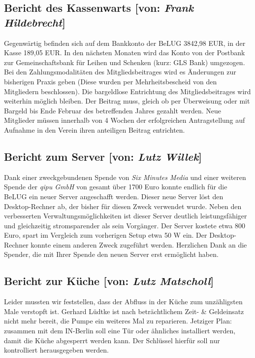 \documentclass[11pt,a4paper,ngerman]{article}
\begin{document}
  \subsection{Bericht des Kassenwarts [von: 
\textcolor{hellgrau.60}{\textsl{Frank Hildebrecht}}]}

Gegenwärtig befinden sich auf dem Bankkonto der BeLUG 3842,98 EUR, in der Kasse 
189,05 EUR. In den nächsten Monaten wird das Konto von der Postbank zur 
Gemeinschaftsbank für Leihen und Schenken (kurz: GLS Bank) umgezogen. Bei den 
Zahlungsmodalitäten des Mitgliedsbeitrages wird es Änderungen zur 
bisherigen Praxis geben (Diese wurden per Mehrheitsbescheid von den Mitgliedern 
beschlossen). Die bargeldlose Entrichtung des Mitgliedsbeitrages wird weiterhin 
möglich bleiben. Der Beitrag muss, gleich ob per Überweisung oder mit Bargeld 
bis Ende Februar des betreffenden Jahres gezahlt werden. Neue Mitglieder müssen 
innerhalb von 4 Wochen der erfolgreichen Antragstellung auf Aufnahme in 
den Verein ihren anteiligen Beitrag entrichten.


  \subsection{Bericht zum Server [von: 
\textcolor{hellgrau.60}{\textsl{Lutz Willek}}]}

Dank einer zweckgebundenen Spende von \emph{Six Minutes Media} und einer 
weiteren Spende der \emph{qipu GmbH} von gesamt über 1700 Euro konnte endlich 
für die BeLUG ein neuer Server angeschafft werden. Dieser neue Server löst den 
Desktop-Rechner ab, der bisher für diesen Zweck verwendet wurde. Neben den 
verbesserten Verwaltungsmöglichkeiten ist dieser Server deutlich 
leistungsfähiger und gleichzeitig stromsparender als sein Vorgänger. Der Server 
kostete etwa 800 Euro, spart im Vergleich zum vorherigen Setup etwa 50 W ein. 
Der Desktop-Rechner konnte einem anderen Zweck zugeführt werden. Herzlichen 
Dank an die Spender, die mit Ihrer Spende den neuen Server erst ermöglicht 
haben.


  \subsection{Bericht zur Küche [von: 
\textcolor{hellgrau.60}{\textsl{Lutz Matscholl}}]}

Leider mussten wir feststellen, dass der Abfluss in der Küche zum unzähligsten 
Male verstopft ist. Gerhard Lüdtke ist nach beträchtlichem Zeit- \& Geldeinsatz 
nicht mehr bereit, die Pumpe ein weiteres Mal zu reparieren. Jetziger Plan: 
zusammen mit dem IN-Berlin soll eine Tür oder ähnliches installiert werden, 
damit die Küche abgesperrt werden kann. Der Schlüssel hierfür soll nur 
kontrolliert herausgegeben werden.
\end{document}
